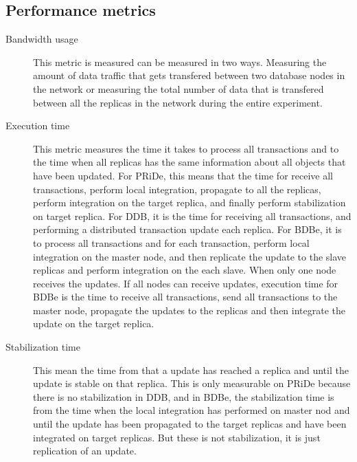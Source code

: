 \subsection{Performance metrics} %
\label{sub:performance_metrics}


\begin{description}

	\item[Bandwidth usage]

This metric is measured can be measured in two ways. Measuring the amount of data traffic that gets transfered between two database nodes in the network or measuring the total number of data that is transfered between all the replicas in the network during the entire experiment.

	\item[Execution time]

	This metric measures the time it takes to process all transactions and to the time when all replicas has the same information about all objects that have been updated. For PRiDe, this means that the time for receive all transactions, perform local integration, propagate to all the replicas, perform integration on the target replica, and finally perform stabilization on target replica. For DDB, it is the time for receiving all transactions, and performing a distributed transaction update each replica. For BDBe, it is to process all transactions and for each transaction, perform local integration on the master node, and then replicate the update to the slave replicas and perform integration on the each slave. When only one node receives the updates. If all nodes can receive updates, execution time for BDBe is the time to receive all transactions, send all transactions to the master node, propagate the updates to the replicas and then integrate the update on the target replica.


	\item[Stabilization time]
	This mean the time from that a update has reached a replica and until the update is stable on that replica. This is only measurable on PRiDe because there is no stabilization in DDB, and in BDBe, the stabilization time is from the time when the local integration has performed on master nod and until the update has been propagated to the target replicas and have been integrated on target replicas. But these is not stabilization, it is just replication of an update.


\end{description}
